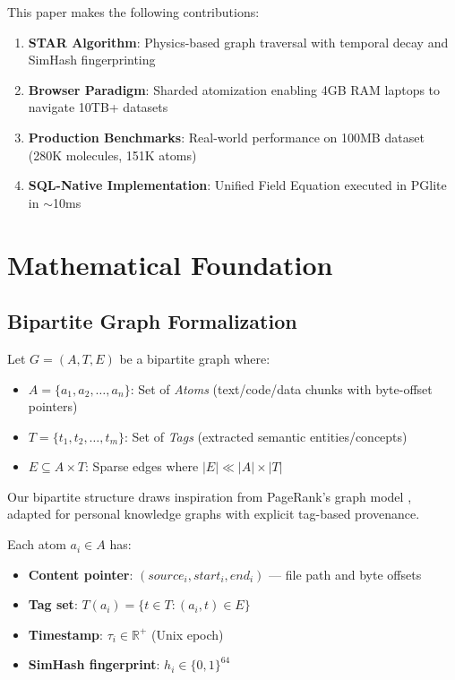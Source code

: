 \documentclass[11pt]{article}
\begin{document}
This paper makes the following contributions:

\begin{enumerate}
    \item \textbf{STAR Algorithm}: Physics-based graph traversal with temporal decay and SimHash fingerprinting
    \item \textbf{Browser Paradigm}: Sharded atomization enabling 4GB RAM laptops to navigate 10TB+ datasets
    \item \textbf{Production Benchmarks}: Real-world performance on 100MB dataset (280K molecules, 151K atoms)
    \item \textbf{SQL-Native Implementation}: Unified Field Equation executed in PGlite in $\sim$10ms
\end{enumerate}

\section{Mathematical Foundation}
\label{sec:math}

\subsection{Bipartite Graph Formalization}

Let $G = (A, T, E)$ be a bipartite graph where:

\begin{itemize}
    \item \textbf{$A = \{a_1, a_2, \ldots, a_n\}$}: Set of \textit{Atoms} (text/code/data chunks with byte-offset pointers)
    \item \textbf{$T = \{t_1, t_2, \ldots, t_m\}$}: Set of \textit{Tags} (extracted semantic entities/concepts)
    \item \textbf{$E \subseteq A \times T$}: Sparse edges where $|E| \ll |A| \times |T|$
\end{itemize}

Our bipartite structure draws inspiration from PageRank's graph model \cite{brin1998anatomy}, adapted for personal knowledge graphs with explicit tag-based provenance.

Each atom $a_i \in A$ has:
\begin{itemize}
    \item \textbf{Content pointer}: $(source_i, start_i, end_i)$ --- file path and byte offsets
    \item \textbf{Tag set}: $T(a_i) = \{t \in T : (a_i, t) \in E\}$
    \item \textbf{Timestamp}: $\tau_i \in \mathbb{R}^+$ (Unix epoch)
    \item \textbf{SimHash fingerprint}: $h_i \in \{0,1\}^{64}$
\end{itemize}
\end{document}
